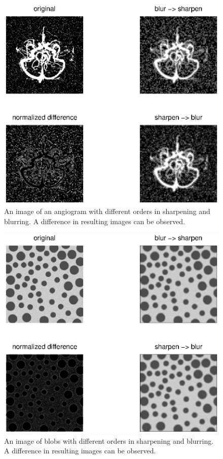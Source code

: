 \begin{figure}[!Htb]
 \centering
 \includegraphics{angios.eps}
 \caption{An image of an angiogram with different orders in sharpening and blurring. A difference in resulting images can be observed. }
 \label{fig:angios}
\end{figure}
\begin{figure}[!Htb]
 \centering
 \includegraphics{blobs.eps}
 \caption{An image of blobs with different orders in sharpening and blurring. A difference in resulting images can be observed.}
 \label{fig:blobs}
\end{figure}
\clearpage
